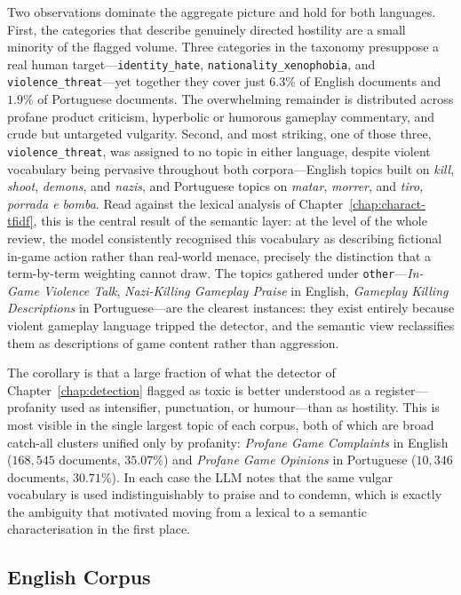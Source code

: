 Two observations dominate the aggregate picture and hold for both languages. First, the categories that describe genuinely directed hostility are a small minority of the flagged volume. Three categories in the taxonomy presuppose a real human target---\texttt{identity\_hate}, \texttt{nationality\_xenophobia}, and \texttt{violence\_threat}---yet together they cover just $6.3\%$ of English documents and $1.9\%$ of Portuguese documents. The overwhelming remainder is distributed across profane product criticism, hyperbolic or humorous gameplay commentary, and crude but untargeted vulgarity. Second, and most striking, one of those three, \texttt{violence\_threat}, was assigned to no topic in either language, despite violent vocabulary being pervasive throughout both corpora---English topics built on \emph{kill}, \emph{shoot}, \emph{demons}, and \emph{nazis}, and Portuguese topics on \emph{matar}, \emph{morrer}, and \emph{tiro, porrada e bomba}. Read against the lexical analysis of Chapter~\ref{chap:charact-tfidf}, this is the central result of the semantic layer: at the level of the whole review, the model consistently recognised this vocabulary as describing fictional in-game action rather than real-world menace, precisely the distinction that a term-by-term weighting cannot draw. The topics gathered under \texttt{other}---\emph{In-Game Violence Talk}, \emph{Nazi-Killing Gameplay Praise} in English, \emph{Gameplay Killing Descriptions} in Portuguese---are the clearest instances: they exist entirely because violent gameplay language tripped the detector, and the semantic view reclassifies them as descriptions of game content rather than aggression.

The corollary is that a large fraction of what the detector of Chapter~\ref{chap:detection} flagged as toxic is better understood as a register---profanity used as intensifier, punctuation, or humour---than as hostility. This is most visible in the single largest topic of each corpus, both of which are broad catch-all clusters unified only by profanity: \emph{Profane Game Complaints} in English ($168{,}545$ documents, $35.07\%$) and \emph{Profane Game Opinions} in Portuguese ($10{,}346$ documents, $30.71\%$). In each case the LLM notes that the same vulgar vocabulary is used indistinguishably to praise and to condemn, which is exactly the ambiguity that motivated moving from a lexical to a semantic characterisation in the first place.

\subsection{English Corpus}
\label{subsec:semantic-en}

